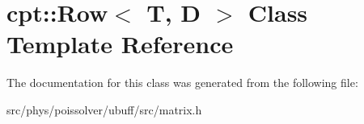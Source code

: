 \hypertarget{classcpt_1_1Row}{}\section{cpt\+:\+:Row$<$ T, D $>$ Class Template Reference}
\label{classcpt_1_1Row}


The documentation for this class was generated from the following file\+:\begin{DoxyCompactItemize}
\item 
src/phys/poissolver/ubuff/src/matrix.\+h\end{DoxyCompactItemize}

